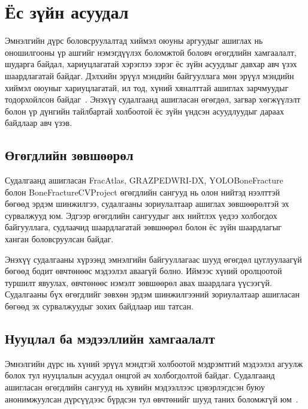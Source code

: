 
\chapter{Ёс зүйн асуудал}
\label{Chapter7}
\pagecolor{Beige}

Эмнэлгийн дүрс боловсруулалтад хиймэл оюуны аргуудыг ашиглах нь оношилгооны үр ашгийг нэмэгдүүлэх боломжтой боловч өгөгдлийн хамгаалалт, шударга байдал, хариуцлагатай хэрэглээ зэрэг ёс зүйн асуудлыг давхар авч үзэх шаардлагатай байдаг. Дэлхийн эрүүл мэндийн байгууллага мөн эрүүл мэндийн хиймэл оюуныг хариуцлагатай, ил тод, хүний хяналттай ашиглах зарчмуудыг тодорхойлсон байдаг~\cite{ref45}. Энэхүү судалгаанд ашигласан өгөгдөл, загвар хөгжүүлэлт болон үр дүнгийн тайлбартай холбоотой ёс зүйн үндсэн асуудлуудыг дараах байдлаар авч үзэв.

\section{Өгөгдлийн зөвшөөрөл}

Судалгаанд ашигласан FracAtlas, GRAZPEDWRI-DX, YOLOBoneFracture болон BoneFractureCVProject өгөгдлийн сангууд нь олон нийтэд нээлттэй бөгөөд эрдэм шинжилгээ, судалгааны зориулалтаар ашиглах зөвшөөрөлтэй эх сурвалжууд юм. Эдгээр өгөгдлийн сангуудыг анх нийтлэх үедээ холбогдох байгууллага, судлаачид шаардлагатай зөвшөөрөл болон ёс зүйн шаардлагыг ханган боловсруулсан байдаг.

Энэхүү судалгааны хүрээнд эмнэлгийн байгууллагаас шууд өгөгдөл цуглуулаагүй бөгөөд бодит өвчтөнөөс мэдээлэл аваагүй болно. Иймээс хүний оролцоотой туршилт явуулах, өвчтөнөөс нэмэлт зөвшөөрөл авах шаардлага үүсээгүй. Судалгааны бүх өгөгдлийг зөвхөн эрдэм шинжилгээний зориулалтаар ашигласан бөгөөд эх сурвалжуудыг зохих байдлаар иш татсан.

\section{Нууцлал ба мэдээллийн хамгаалалт}

Эмнэлгийн дүрс нь хүний эрүүл мэндтэй холбоотой мэдрэмтгий мэдээлэл агуулж болох тул нууцлалын асуудал онцгой ач холбогдолтой байдаг. Судалгаанд ашигласан өгөгдлийн сангууд нь хувийн мэдээллээс цэвэрлэгдсэн буюу анонимжуулсан дүрсүүдээс бүрдсэн тул өвчтөнийг шууд таних боломжгүй юм~\cite{ref46}.

